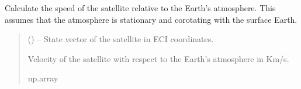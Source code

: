 \documentclass[letterpaper,10pt,english]{sphinxmanual}
\begin{document}
\begin{fulllineitems}
\label{\detokenize{fspsim.utils:fspsim.utils.Conversions.v_rel}}
\pysigstartsignatures
{}
\pysigstopsignatures
\sphinxAtStartPar
Calculate the speed of the satellite relative to the Earth’s atmosphere.
This assumes that the atmosphere is stationary and co\sphinxhyphen{}rotating with the surface Earth.
\begin{quote}\begin{description}
\sphinxAtStartPar
{} () – State vector of the satellite in ECI coordinates.

\sphinxAtStartPar
Velocity of the satellite with respect to the Earth’s atmosphere in Km/s.

\sphinxAtStartPar
np.array

\end{description}\end{quote}

\end{fulllineitems}

\end{document}

